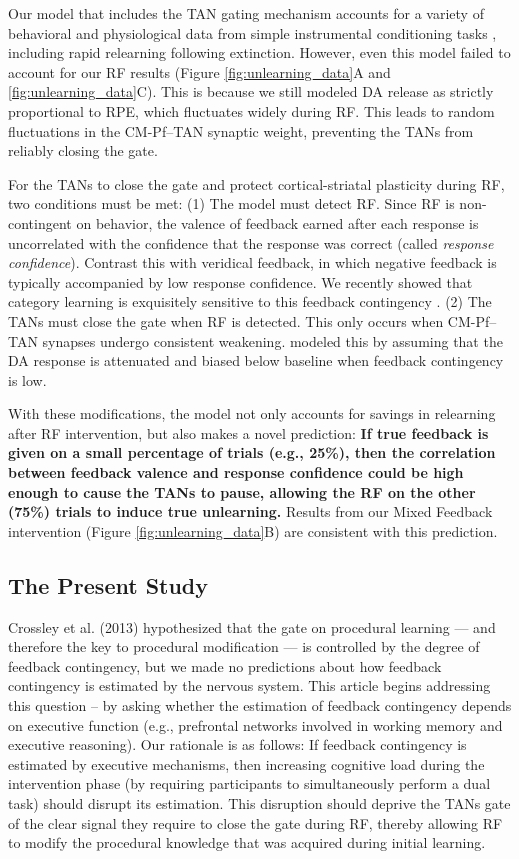 \documentclass[apacite,draftfirst,man]{apa6}
\begin{document}
Our model that includes the TAN gating mechanism accounts for a variety of
behavioral and physiological data from simple instrumental conditioning tasks
\cite{AshbyCrossley2011, CrossleyEtAl2016}, including rapid relearning following
extinction. However, even this model failed to account for our RF results (Figure
\ref{fig:unlearning_data}A and \ref{fig:unlearning_data}C). This is because we
still modeled DA release as strictly proportional to RPE, which fluctuates
widely during RF. This leads to random fluctuations in the CM-Pf--TAN synaptic
weight, preventing the TANs from reliably closing the gate.

For the TANs to close the gate and protect cortical-striatal plasticity during
RF, two conditions must be met: (1) The model must detect RF. Since RF is
non-contingent on behavior, the valence of feedback earned after each response
is uncorrelated with the confidence that the response was correct (called
\textit{response confidence}). Contrast this with veridical feedback, in which
negative feedback is typically accompanied by low response confidence. We
recently showed that category learning is exquisitely sensitive to this feedback
contingency \cite{AshbyVucovich2016}. (2) The TANs must close the gate when RF
is detected. This only occurs when CM-Pf--TAN synapses undergo consistent
weakening.  modeled this by assuming that the DA
response is attenuated and biased below baseline when feedback contingency is
low.

With these modifications, the model not only accounts for savings in relearning
after RF intervention, but also makes a novel prediction: \textbf{If true
feedback is given on a small percentage of trials (e.g., 25\%), then the
correlation between feedback valence and response confidence could be high
enough to cause the TANs to pause, allowing the RF on the other (75\%) trials to
induce true unlearning.} Results from our Mixed Feedback intervention (Figure
\ref{fig:unlearning_data}B) are consistent with this prediction.

\subsection*{The Present Study}
Crossley et al. (2013) hypothesized that the gate on procedural learning --- and
therefore the key to procedural modification --- is controlled by the degree of
feedback contingency, but we made no predictions about how feedback contingency
is estimated by the nervous system. This article begins addressing this question
-- by asking whether the estimation of feedback contingency depends on executive
function (e.g., prefrontal networks involved in working memory and executive
reasoning). Our rationale is as follows:
If feedback contingency is estimated by executive mechanisms, then increasing
cognitive load during the intervention phase (by requiring participants to
simultaneously perform a dual task) should disrupt its estimation. This
disruption should deprive the TANs gate of the clear signal they require to
close the gate during RF, thereby allowing RF to modify the procedural knowledge
that was acquired during initial learning.
\end{document}
